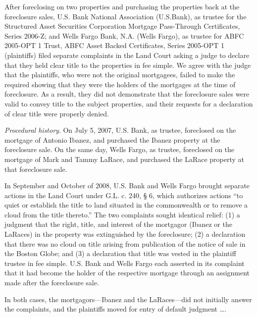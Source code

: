 

After foreclosing on two properties and purchasing the properties back at the
foreclosure sales, U.S. Bank National Association (U.S.Bank), as trustee for
the Structured Asset Securities Corporation Mortgage Pass-Through Certificates,
Series 2006-Z; and Wells Fargo Bank, N.A. (Wells Fargo), as trustee for ABFC
2005-OPT 1 Trust, ABFC Asset Backed Certificates, Series 2005-OPT 1
(plaintiffs) filed separate complaints in the Land Court asking a judge to
declare that they held clear title to the properties in fee simple. We agree
with the judge that the plaintiffs, who were not the original mortgagees,
failed to make the required showing that they were the holders of the mortgages
at the time of foreclosure. As a result, they did not demonstrate that the
foreclosure sales were valid to convey title to the subject properties, and
their requests for a declaration of clear title were properly denied.

\textit{Procedural history}. On July 5, 2007, U.S. Bank, as trustee, foreclosed
on the mortgage of Antonio Ibanez, and purchased the Ibanez property at the
foreclosure sale. On the same day, Wells Fargo, as trustee, foreclosed on the
mortgage of Mark and Tammy LaRace, and purchased the LaRace property at that
foreclosure sale.

In September and October of 2008, U.S. Bank and Wells Fargo brought separate
actions in the Land Court under G.L. c. 240, {\S} 6, which authorizes actions
``to quiet or establish the title to land situated in the commonwealth or to
remove a cloud from the title thereto.'' The two complaints sought identical
relief: (1) a judgment that the right, title, and interest of the mortgagor
(Ibanez or the LaRaces) in the property was extinguished by the foreclosure;
(2) a declaration that there was no cloud on title arising from publication of
the notice of sale in the Boston Globe; and (3) a declaration that title was
vested in the plaintiff trustee in fee simple. U.S. Bank and Wells Fargo each
asserted in its complaint that it had become the holder of the respective
mortgage through an assignment made after the foreclosure sale.

In both cases, the mortgagors---Ibanez and the LaRaces---did not initially
answer the complaints, and the plaintiffs moved for entry of default
judgment \dots .

